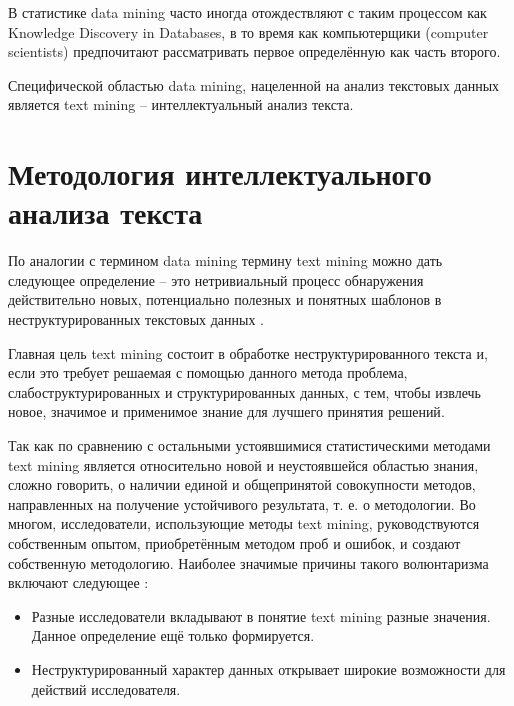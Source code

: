 В статистике data mining часто иногда отождествляют с таким процессом как Knowledge Discovery in Databases, в то время как компьютерщики (computer scientists) предпочитают рассматривать первое определённую как часть второго.

Специфической областью data mining, нацеленной на анализ текстовых данных является text mining -- интеллектуальный анализ текста.



\section{Методология интеллектуального анализа текста} \label{sect1_3}

По аналогии с термином data mining термину text mining можно дать следующее определение -- это нетривиальный процесс обнаружения действительно новых, потенциально полезных и понятных шаблонов в неструктурированных текстовых данных \cite[стр. 211]{bargesyan2009}.

Главная цель text mining состоит в обработке неструктурированного текста и, если это требует решаемая с помощью данного метода проблема, слабоструктурированных и структурированных данных, с тем, чтобы извлечь новое, значимое и применимое знание для лучшего принятия решений\cite[стр. 78]{practical_tm}.

Так как по сравнению с остальными устоявшимися статистическими методами text mining является относительно новой и неустоявшейся областью знания, сложно говорить, о наличии единой и общепринятой совокупности методов, направленных на получение устойчивого результата, т. е. о методологии. Во многом, исследователи, использующие методы text mining, руководствуются собственным опытом, приобретённым методом проб и ошибок, и создают собственную методологию. Наиболее значимые причины такого волюнтаризма включают следующее \cite[стр. 74]{practical_tm}:

\begin{itemize}
\item Разные исследователи вкладывают в понятие text mining разные значения. Данное определение ещё только формируется.
\item Неструктурированный характер данных открывает широкие возможности для действий исследователя.
\end{itemize}

